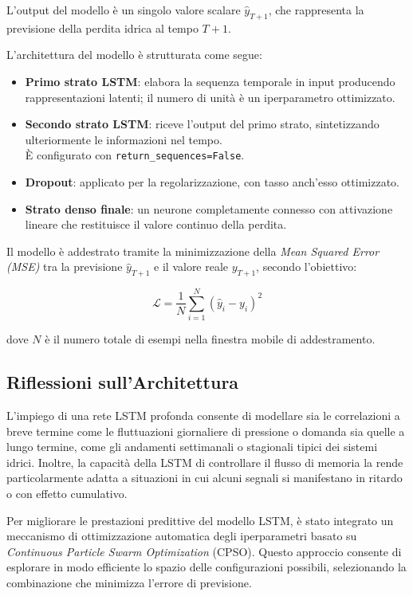 \documentclass{article}
\begin{document}
L'output del modello è un singolo valore scalare $\hat{y}_{T+1}$, che rappresenta la previsione della 
perdita idrica al tempo $T+1$.

L’architettura del modello è strutturata come segue:

\begin{itemize}
    \item \textbf{Primo strato LSTM}: elabora la sequenza temporale in input producendo rappresentazioni latenti; il numero di unità è un iperparametro ottimizzato.
    \item \textbf{Secondo strato LSTM}: riceve l'output del primo strato, sintetizzando ulteriormente le informazioni nel tempo. \\È configurato con \verb|return_sequences=False|.
    \item \textbf{Dropout}: applicato per la regolarizzazione, con tasso anch'esso ottimizzato.
    \item \textbf{Strato denso finale}: un neurone completamente connesso con attivazione lineare che restituisce il valore continuo della perdita.
\end{itemize}

Il modello è addestrato tramite la minimizzazione della \textit{Mean Squared Error (MSE)} tra la 
previsione $\hat{y}_{T+1}$ e il valore reale $y_{T+1}$, secondo l’obiettivo:

\begin{equation}
\mathcal{L} = \frac{1}{N} \sum_{i=1}^N \left( \hat{y}_{i} - y_{i} \right)^2
\end{equation}

dove $N$ è il numero totale di esempi nella finestra mobile di addestramento.

\subsection{Riflessioni sull’Architettura}

L’impiego di una rete LSTM profonda consente di modellare sia le correlazioni a breve termine come le 
fluttuazioni giornaliere di pressione o domanda sia quelle a lungo termine, come gli andamenti 
settimanali o stagionali tipici dei sistemi idrici. Inoltre, la capacità della LSTM di controllare il 
flusso di memoria la rende particolarmente adatta a situazioni in cui alcuni segnali si manifestano in 
ritardo o con effetto cumulativo.

Per migliorare le prestazioni predittive del modello LSTM, è stato integrato un meccanismo di 
ottimizzazione automatica degli iperparametri basato su \textit{Continuous Particle Swarm Optimization} 
(CPSO). Questo approccio consente di esplorare in modo efficiente lo spazio delle configurazioni 
possibili, selezionando la combinazione che minimizza l'errore di previsione.
\end{document}
